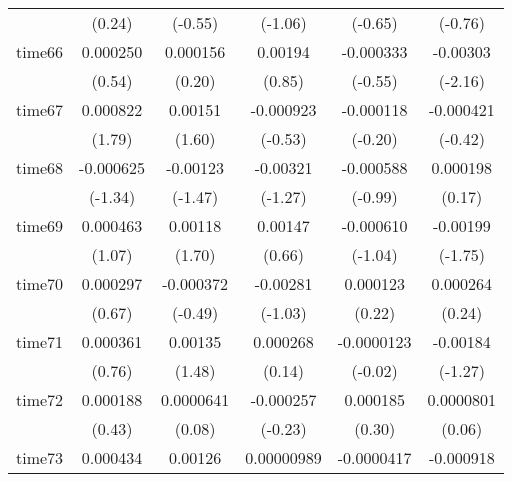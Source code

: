 \begin{table}[htbp]
\begin{tabular}{l*{5}{c}}
            &      (0.24)         &     (-0.55)         &     (-1.06)         &     (-0.65)         &     (-0.76)         \\
time66      &    0.000250         &    0.000156         &     0.00194         &   -0.000333         &    -0.00303\sym{*}  \\
            &      (0.54)         &      (0.20)         &      (0.85)         &     (-0.55)         &     (-2.16)         \\
time67      &    0.000822         &     0.00151         &   -0.000923         &   -0.000118         &   -0.000421         \\
            &      (1.79)         &      (1.60)         &     (-0.53)         &     (-0.20)         &     (-0.42)         \\
time68      &   -0.000625         &    -0.00123         &    -0.00321         &   -0.000588         &    0.000198         \\
            &     (-1.34)         &     (-1.47)         &     (-1.27)         &     (-0.99)         &      (0.17)         \\
time69      &    0.000463         &     0.00118         &     0.00147         &   -0.000610         &    -0.00199         \\
            &      (1.07)         &      (1.70)         &      (0.66)         &     (-1.04)         &     (-1.75)         \\
time70      &    0.000297         &   -0.000372         &    -0.00281         &    0.000123         &    0.000264         \\
            &      (0.67)         &     (-0.49)         &     (-1.03)         &      (0.22)         &      (0.24)         \\
time71      &    0.000361         &     0.00135         &    0.000268         &  -0.0000123         &    -0.00184         \\
            &      (0.76)         &      (1.48)         &      (0.14)         &     (-0.02)         &     (-1.27)         \\
time72      &    0.000188         &   0.0000641         &   -0.000257         &    0.000185         &   0.0000801         \\
            &      (0.43)         &      (0.08)         &     (-0.23)         &      (0.30)         &      (0.06)         \\
time73      &    0.000434         &     0.00126         &  0.00000989         &  -0.0000417         &   -0.000918         \\

\end{tabular}
\end{table}

